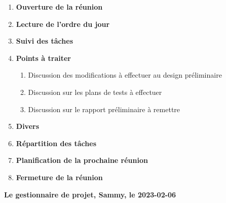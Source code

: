 \documentclass[12pt]{ULojpv}
\begin{document}
\entete
\begin{enumerate}
   \item \textbf{Ouverture de la réunion}
   \item \textbf{Lecture de l'ordre du jour}
   \item \textbf{Suivi des tâches}
   \item \textbf{Points à traiter}
      \begin{enumerate}
         \item Discussion des modifications à effectuer au design préliminaire

         \item Discussion sur les plans de tests à effectuer

         \item Discussion sur le rapport préliminaire à remettre

      \end{enumerate}

   \item \textbf{Divers}
   
   \item \textbf{Répartition des tâches}
   
   \item \textbf{Planification de la prochaine réunion}

   \item \textbf{Fermeture de la réunion}
\end{enumerate}

\begin{flushright}
   \textbf{Le gestionnaire de projet, Sammy, le 2023-02-06}

\end{flushright}
\end{document}

